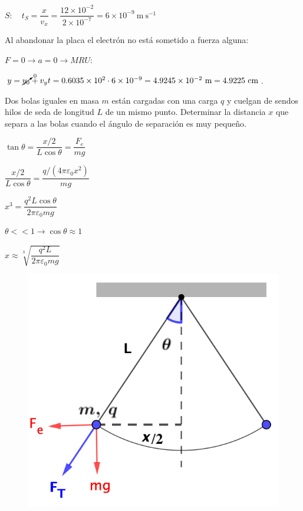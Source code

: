 $S: \quad t_S=\dfrac{x}{v_x}=\dfrac{12\times 10^{-2}}{2\times 10^{-7}}=6\times 10^{-9} \ \mathrm{m\ s}^{-1}$ 

Al abandonar la placa el electrón no está sometido a fuerza alguna: 

$F=0\to a=0 \to MRU: \quad $

$y=\cancelto{0}{y_0}+v_y t=0.6035\times 10^2 \cdot 6 \times 10^{-9}=4.9245\times 10^{-2} \ \mathrm{m}=4.9225 \ \mathrm{cm}$.

\begin{prob}
Dos bolas iguales en masa $m$ están cargadas con una carga $q$ y cuelgan de sendos hilos de seda de longitud $L$ de un mismo punto. Determinar la distancia $x$ que separa a las bolas cuando el ángulo de separación es muy pequeño.	
\end{prob}

\begin{multicols}{2}
$\tan \theta=\dfrac{x/2}{L\cos \theta}=\dfrac{F_e}{mg}$

$\dfrac{x/2}{L\cos \theta}=\dfrac{q/(4\pi \varepsilon_0 x^2)}{mg}$

$x^3=\dfrac{q^2L\cos \theta}{2\pi \varepsilon_0 m g}$

$\theta << 1 \to \cos \theta \approx 1$

$x\approx \sqrt[3]{\dfrac{q^2L}{2\pi \varepsilon_0 m g}}$
\begin{figure}[H]
	\centering
	\includegraphics[width=.5\textwidth]{imagenes/imagenes22/T22IM18.png}
\end{figure}	
\end{multicols}


